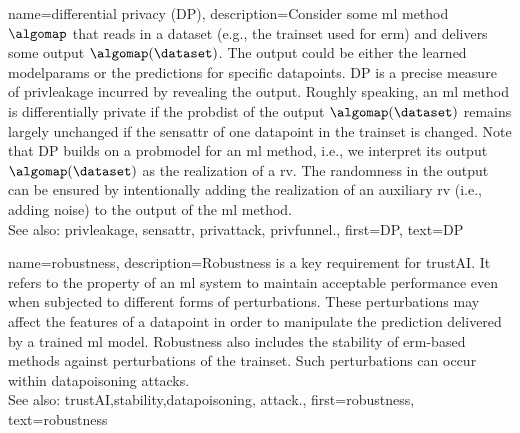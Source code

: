 {name={differential privacy (DP)},
  description={Consider some \gls{ml} method $\algomap$ 
  	that reads in a \gls{dataset} (e.g., the \gls{trainset} 
  	used for \gls{erm}) and delivers some output $\algomap(\dataset)$. The output 
  	could be either the learned \glspl{modelparam} or the \glspl{prediction} for specific \glspl{datapoint}. 
  	DP is a precise measure of \gls{privleakage} incurred by revealing the 
  	output. Roughly speaking, an \gls{ml} method is differentially private if the \gls{probdist} 
  	of the output $\algomap(\dataset)$ remains largely unchanged if the \gls{sensattr} 
  	of one \gls{datapoint} in the \gls{trainset} is changed. Note that DP 
  	builds on a \gls{probmodel} for an \gls{ml} method, i.e., we interpret its output $\algomap(\dataset)$ 
  	as the \gls{realization} of a \gls{rv}. The randomness in the output can be ensured 
  	by intentionally adding the \gls{realization} of an auxiliary \gls{rv} (i.e., adding noise) to 
  	the output of the \gls{ml} method.
				\\ 
	See also: \gls{privleakage}, \gls{sensattr}, \gls{privattack}, \gls{privfunnel}.}, 
  first={DP}, 
  text={DP} 
}

{name={robustness},
	description={Robustness is a key requirement for \gls{trustAI}. It
		refers to the property of an \gls{ml} system to maintain acceptable performance even when 
		subjected to different forms of perturbations. These perturbations may affect the \glspl{feature} 
		of a \gls{datapoint} in order to manipulate the \gls{prediction} delivered by a trained \gls{ml} \gls{model}. 
		Robustness also includes the \gls{stability} of \gls{erm}-based methods against perturbations 
		of the \gls{trainset}. Such perturbations can occur within \gls{datapoisoning} \glspl{attack}. 
		\\ 
		See also: \gls{trustAI},\gls{stability},\gls{datapoisoning}, \gls{attack}.}, 
	first={robustness}, 
	text={robustness} 
}


